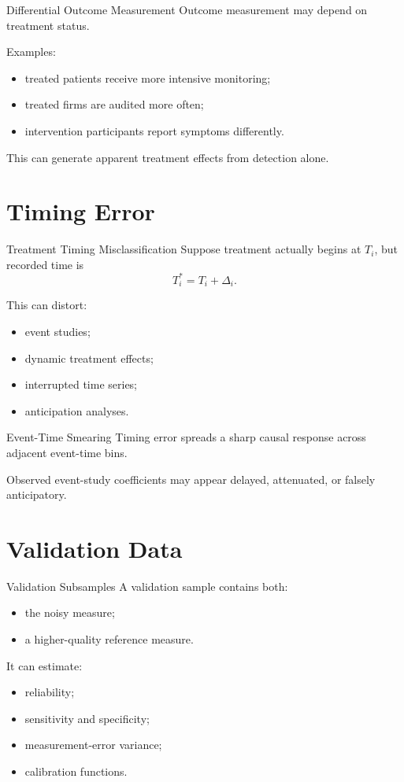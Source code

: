 \documentclass[aspectratio=169,11pt]{beamer}
\begin{document}
\begin{frame}{Differential Outcome Measurement}
Outcome measurement may depend on treatment status.

Examples:
\begin{itemize}
\item treated patients receive more intensive monitoring;
\item treated firms are audited more often;
\item intervention participants report symptoms differently.
\end{itemize}

This can generate apparent treatment effects from detection alone.
\end{frame}

\section{Timing Error}

\begin{frame}{Treatment Timing Misclassification}
Suppose treatment actually begins at \(T_i\), but recorded time is
\[
T_i^\ast=T_i+\Delta_i.
\]

This can distort:
\begin{itemize}
\item event studies;
\item dynamic treatment effects;
\item interrupted time series;
\item anticipation analyses.
\end{itemize}
\end{frame}

\begin{frame}{Event-Time Smearing}
Timing error spreads a sharp causal response across adjacent event-time bins.

Observed event-study coefficients may appear delayed, attenuated, or falsely anticipatory.
\end{frame}

\section{Validation Data}

\begin{frame}{Validation Subsamples}
A validation sample contains both:
\begin{itemize}
\item the noisy measure;
\item a higher-quality reference measure.
\end{itemize}

It can estimate:
\begin{itemize}
\item reliability;
\item sensitivity and specificity;
\item measurement-error variance;
\item calibration functions.
\end{itemize}
\end{frame}
\end{document}

